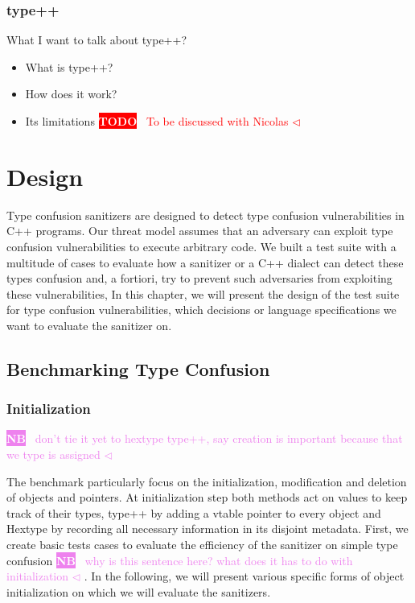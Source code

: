 \documentclass[a4paper,11pt,oneside]{report}
\newcommand{\todobox}[3]{%
       \colorbox{#1}{\textcolor{white}{\sffamily\bfseries\scriptsize #2}}%
       ~\textcolor{#1}{#3} %
       \textcolor{#1}{$\triangleleft$}%
}
\newcommand{\nb}[1]{\todobox{violet}{NB}{#1}}
\newcommand{\adrbqt}[1]{\todobox{red}{TODO}{#1}}
\begin{document}
\subsection{type++}

What I want to talk about type++?
\begin{itemize}
       \item What is type++?
       \item How does it work?
       \item Its limitations \adrbqt{To be discussed with Nicolas}
\end{itemize}


\chapter{Design}

Type confusion sanitizers are designed to detect type confusion vulnerabilities
in C++ programs.  Our threat model assumes that an adversary can exploit type
confusion vulnerabilities to execute arbitrary code.  We built a test suite with
a multitude of cases to evaluate how a sanitizer or a C++ dialect can detect
these types confusion and, a fortiori, try to prevent such adversaries from
exploiting these vulnerabilities, In this chapter, we will present the design of
the test suite for type confusion vulnerabilities, which decisions or language
specifications we want to evaluate the sanitizer on.

\section{Benchmarking Type Confusion}

\subsection{Initialization}
\nb{don't tie it yet to hextype type++, say creation is important because that we type is assigned}

The benchmark particularly focus on the initialization, modification and
deletion of objects and pointers. At initialization step both methods act on
values to keep track of their types, type++ by adding a vtable pointer to every
object and Hextype by recording all necessary information in its disjoint
metadata.  First, we create basic tests cases to evaluate the efficiency of the
sanitizer on simple type confusion\nb{why is this sentence here? what does it has to do with initialization}. In the following, we will present various
specific forms of object initialization on which we will evaluate the
sanitizers.
\end{document}
